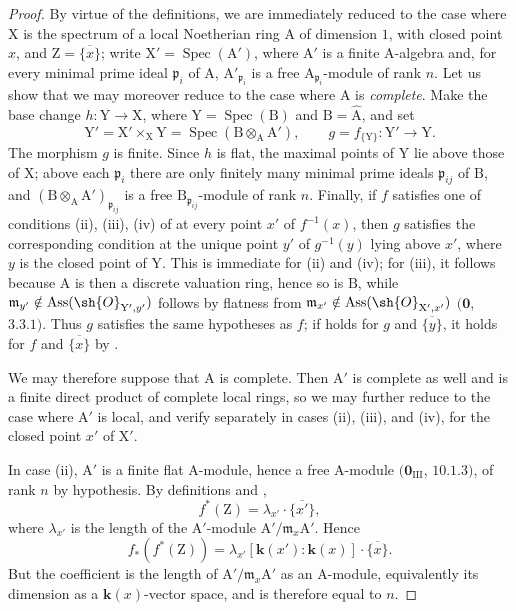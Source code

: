 \begin{proof}
By virtue of the definitions, we are immediately reduced to the case where $\mathrm{X}$ is the spectrum of a local Noetherian ring $\mathrm{A}$ of dimension $1$, with closed point $x$, and $\mathrm{Z}=\overline{\{x\}}$; write $\mathrm{X}'=\operatorname{Spec}(\mathrm{A}')$, where $\mathrm{A}'$ is a finite A-algebra and, for every minimal prime ideal $\mathfrak{p}_i$ of $\mathrm{A}$, $\mathrm{A}'_{\mathfrak{p}_i}$ is a free $\mathrm{A}_{\mathfrak{p}_i}$-module of rank $n$.
Let us show that we may moreover reduce to the case where $\mathrm{A}$ is \emph{complete}.  Make the base change $h:\mathrm{Y}\to\mathrm{X}$, where $\mathrm{Y}=\operatorname{Spec}(\mathrm{B})$ and $\mathrm{B}=\widehat{\mathrm{A}}$, and set
\[
  \mathrm{Y}'=\mathrm{X}'\times_{\mathrm{X}}\mathrm{Y}
  =\operatorname{Spec}(\mathrm{B}\otimes_{\mathrm{A}}\mathrm{A}'),
  \qquad g=f_{\{\mathrm{Y}\}}:\mathrm{Y}'\to\mathrm{Y}.
\]
The morphism $g$ is finite.  Since $h$ is flat, the maximal points of $\mathrm{Y}$ lie above those of $\mathrm{X}$; above each $\mathfrak{p}_i$ there are only finitely many minimal prime ideals $\mathfrak{p}_{ij}$ of $\mathrm{B}$, and $(\mathrm{B}\otimes_{\mathrm{A}}\mathrm{A}')_{\mathfrak{p}_{ij}}$ is a free $\mathrm{B}_{\mathfrak{p}_{ij}}$-module of rank $n$.
Finally, if $f$ satisfies one of conditions (ii), (iii), (iv) of  at every point $x'$ of $f^{-1}(x)$, then $g$ satisfies the corresponding condition at the unique point $y'$ of $g^{-1}(y)$ lying above $x'$, where $y$ is the closed point of $\mathrm{Y}$.  This is immediate for (ii) and (iv); for (iii), it follows because $\mathrm{A}$ is then a discrete valuation ring, hence so is $\mathrm{B}$, while $\mathfrak{m}_{y'}\notin\operatorname{Ass}(\sh{O}_{\mathrm{Y}',y'})$ follows by flatness from $\mathfrak{m}_{x'}\notin\operatorname{Ass}(\sh{O}_{\mathrm{X}',x'})$ $(\mathbf{0}$, $3.3.1)$.
Thus $g$ satisfies the same hypotheses as $f$; if  holds for $g$ and $\overline{\{y\}}$, it holds for $f$ and $\overline{\{x\}}$ by .

We may therefore suppose that $\mathrm{A}$ is complete.  Then $\mathrm{A}'$ is complete as well and is a finite direct product of complete local rings, so we may further reduce to the case where $\mathrm{A}'$ is local, and verify  separately in cases (ii), (iii), and (iv), for the closed point $x'$ of $\mathrm{X}'$.

In case (ii), $\mathrm{A}'$ is a finite flat A-module, hence a free A-module $(\mathbf{0}_{\mathrm{III}}$, $10.1.3)$, of rank $n$ by hypothesis.  By definitions  and ,
\[
  f^*(\mathrm{Z})=\lambda_{x'}\cdot\overline{\{x'\}},
\]
where $\lambda_{x'}$ is the length of the $\mathrm{A}'$-module $\mathrm{A}'/\mathfrak{m}_x\mathrm{A}'$.  Hence
\[
  f_*(f^*(\mathrm{Z}))
  =\lambda_{x'}[\boldsymbol{k}(x'):\boldsymbol{k}(x)]\cdot\overline{\{x\}}.
\]
But the coefficient is the length of $\mathrm{A}'/\mathfrak{m}_x\mathrm{A}'$ as an A-module, equivalently its dimension as a $\boldsymbol{k}(x)$-vector space, and is therefore equal to $n$.


\end{proof}
